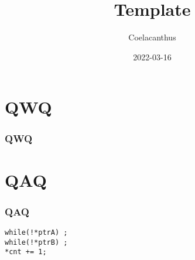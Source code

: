 \documentclass[UTF-8]{ctexbeamer}
\title{Template}
\author{Coelacanthus}
\date{2022-03-16}
\begin{document}
\begin{frame}
	\titlepage
\end{frame}

\section{QWQ}
\begin{frame}
	\frametitle{QWQ}

\end{frame}


\section{QAQ}
\begin{frame}[fragile]
	\frametitle{QAQ}

	\begin{verbatim}
while(!*ptrA) ;
while(!*ptrB) ;
*cnt += 1;
\end{verbatim}
\end{frame}
\end{document}
